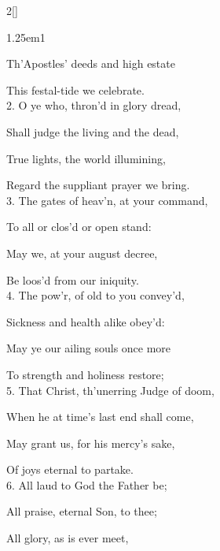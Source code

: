 \begin{paracol}{2}[]
\sloppy

\firstEvensong


\vspace{-1\baselineskip}

\firstEvensongHymn\label{ApostlesEvensong}



\begin{hangparas}{1.25em}{1}

Th'Apostles' deeds and high estate

This festal-tide we celebrate.\\

2. O ye who, thron'd in glory dread,

Shall judge the living and the dead,

True lights, the world illumining,

Regard the suppliant prayer we bring.\\

3. The gates of heav'n, at your command,

To all or clos'd or open stand:

May we, at your august decree,

Be loos'd from our iniquity.\\

4. The pow'r, of old to you convey'd,

Sickness and health alike obey'd:

May ye our ailing souls once more

To strength and holiness restore;\\

5. That Christ, th'unerring Judge of doom,

When he at time's last end shall come,

May grant us, for his mercy's sake,

Of joys eternal to partake.\\

6. All laud to God the Father be;

All praise, eternal Son, to thee;

All glory, as is ever meet,


\end{hangparas}
\end{paracol}
